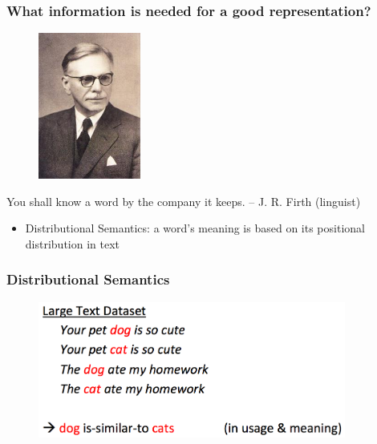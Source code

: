 \documentclass{beamer}
\newcommand{\bi}{\begin{itemize}}
\newcommand{\ei}{\end{itemize}}
\begin{document}
\begin{frame}
\frametitle{What information is needed for a good representation?}
\begin{figure}[htbp]
\begin{center}
\includegraphics[width=0.3\textwidth]{figs/john_firth}
\end{center}
\end{figure}
You shall know a word by the company it keeps. -- J. R. Firth (linguist)
\bi
\item Distributional Semantics: a word's meaning is based on its positional distribution in text
\ei
\end{frame}

\begin{frame}
\frametitle{Distributional Semantics}
\begin{figure}[htbp]
\begin{center}
\includegraphics[width=0.9\textwidth]{figs/distributional_semantics_example}
\end{center}
\end{figure}
\end{frame}
\end{document}
